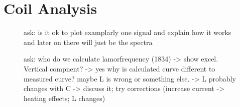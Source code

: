 \section{Coil Analysis}
\label{sec:CoilAnalyssis}

\begin{figure}[H]
    \centering
    
    \caption[]{ask: is it ok to plot examplarly one signal and explain how it works and later on there will just be the spectra}
    \label{fig:PulsandcollectValesignal}
\end{figure}



\begin{figure}[H]
    \centering
    
    \caption[]{ask: who do we calculate lamorfrequency (1834) -> show excel. Vertical compnent? -> yes \newline
    why is calculated curve different to measured curve? maybe L is wrong or something else. -> L probably changes with C -> discuss it; try corrections (increase current -> heating effects; L changes)}
    \label{fig:Coilanalyse}
\end{figure}